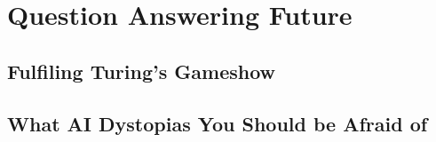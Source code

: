 \documentclass{style/cambridge7A}
\newif\ifproposal\proposalfalse
\newcommand{\proposalpart}[2]{
  \ifproposal
  \else
  \part{#1}
  \fi
}
\newcommand{\chapterfile}[3]{
  \ifproposal
      \begingroup
      \renewcommand{\cleardoublepage}{}
      \renewcommand{\clearpage}{}
      \chapter{#3}\label{ch:#2}
      \endgroup
      \vspace{-0.5cm}
      
      \vspace{-2.5cm}
  \else
      \chapter{#3}
      \label{ch:#2}
      \begin{quote}
        
      \end{quote} 
      
  \fi
  }
\begin{document}








\proposalpart{Question Answering Future}{3}

\chapterfile{300}{gameshow}{Fulfiling Turing's Gameshow}

\chapterfile{310}{sci_fi}{What AI Dystopias You Should be Afraid of}






\ifproposal

\titleformat{\chapter}[display]
{\normalfont%
    \huge%
    \bfseries}{\chaptertitlename\ \thechapter}{20pt}{%
    \Huge %
    }
  \setcounter{chapter}{5}
  \chapter{Watson on Jeopardy!: \\ Unquestioned Answers from \abr{ibm}'s tour
    de force \\ (Sample Chapter)}
  
  \begin{quote}
    
  \end{quote}
  
  
\fi

\backmatter





\printindex
\end{document}
